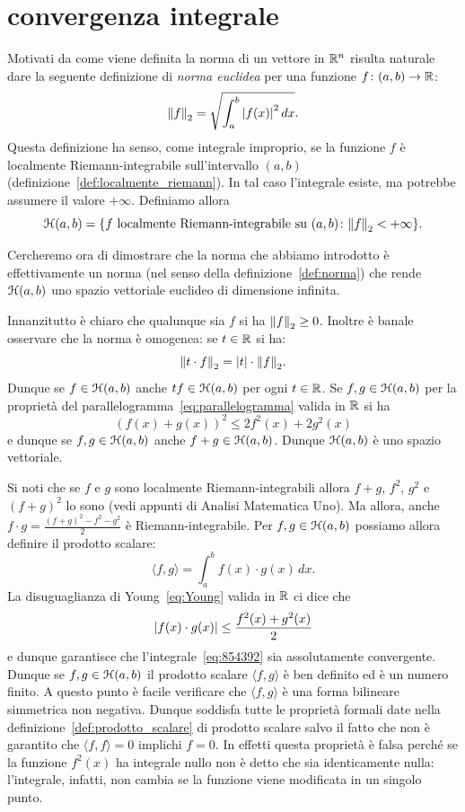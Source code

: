 \section{convergenza integrale}
\label{sec:convergenza_integrale}

Motivati da come viene definita la norma di un vettore
in ${\mathbb R}^n$ risulta naturale
dare la seguente definizione di
\emph{norma euclidea} per una funzione $f\colon (a,b)\to {\mathbb R}$:
\[
  {\left\Vert f\right\Vert}_2 = \sqrt{\int_a^b {\left|f(x)\right|}^2\, dx}.
\]
Questa definizione ha senso, come integrale improprio, se la funzione $f$
è localmente Riemann-integrabile sull'intervallo $(a,b)$
(definizione~\ref{def:localmente_riemann}).
In tal
caso l'integrale esiste, ma potrebbe assumere il valore $+\infty$. Definiamo
allora
\[
\mathcal H(a,b) =
{\left\{ \text{$f$ localmente Riemann-integrabile su $(a,b)$}\colon {\left\Vert  f\right\Vert}_2< +\infty \right\}}.
\]

Cercheremo ora di dimostrare che la norma che abbiamo introdotto
è effettivamente un norma (nel senso della definizione~\ref{def:norma})
che rende $\mathcal H(a,b)$ uno spazio vettoriale euclideo di dimensione infinita.

Innanzitutto è chiaro che qualunque sia $f$ si ha
${\left\Vert  f\right\Vert}_2\ge 0$.
Inoltre è banale osservare che la norma è omogenea: se $t\in {\mathbb R}$ si ha:
\[
  {\left\Vert t\cdot f\right\Vert}_2= {\left|t\right|}\cdot {\left\Vert f\right\Vert}_2.
\]
Dunque se $f\in \mathcal H(a,b)$ anche $t f\in \mathcal H(a,b)$ per ogni $t \in {\mathbb R}$.
Se $f,g\in \mathcal H(a,b)$ per la proprietà del parallelogramma~\eqref{eq:parallelogramma}
valida in ${\mathbb R}$ si ha
\[
  (f(x) + g(x))^2 \le 2f^2(x) + 2 g^2(x)
\]
e dunque se $f,g \in \mathcal H(a,b)$ anche $f+g\in \mathcal H(a,b)$.
Dunque $\mathcal H(a,b)$ è uno spazio vettoriale.

Si noti che se $f$ e $g$ sono localmente Riemann-integrabili 
allora $f+g$, $f^2$, $g^2$ e $(f+g)^2$ lo sono
(vedi appunti di Analisi Matematica Uno).
Ma allora, anche $f\cdot g = \frac{(f+g)^2-f^2-g^2}{2}$ 
è Riemann-integrabile.
Per $f,g\in \mathcal H(a,b)$ possiamo allora definire il prodotto scalare:
\begin{equation}\label{eq:854392}
  \langle f, g\rangle = \int_a^b f(x) \cdot g(x)\, dx.
\end{equation}
La disuguaglianza di
Young~\eqref{eq:Young} valida in ${\mathbb R}$ ci dice che
\[
  {\left|f(x) \cdot g(x)\right|} \le \frac{f^2(x)+g^2(x)}{2}
\]
e dunque garantisce che l'integrale~\eqref{eq:854392}
sia assolutamente convergente. Dunque se $f,g\in \mathcal H(a,b)$
il prodotto scalare $\langle f,g\rangle$ è ben definito ed
è un numero finito. A questo punto è facile verificare
che $\langle f,g\rangle$ è una forma bilineare simmetrica
non negativa. Dunque soddisfa tutte le proprietà formali
date nella definizione~\ref{def:prodotto_scalare} di prodotto scalare
salvo il fatto che non è garantito che $\langle f,f\rangle = 0$
implichi $f=0$. In effetti questa proprietà è falsa perché
se la funzione $f^2(x)$ ha integrale nullo non è detto che sia
identicamente nulla: l'integrale, infatti, non cambia
se la funzione viene modificata in un singolo punto.

